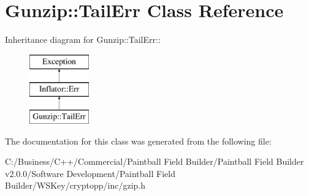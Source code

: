 \hypertarget{class_gunzip_1_1_tail_err}{
\section{Gunzip::TailErr Class Reference}
\label{class_gunzip_1_1_tail_err}
}
Inheritance diagram for Gunzip::TailErr::\begin{figure}[H]
\begin{center}
\leavevmode
\includegraphics[height=3cm]{class_gunzip_1_1_tail_err}
\end{center}
\end{figure}


The documentation for this class was generated from the following file:\begin{DoxyCompactItemize}
\item 
C:/Business/C++/Commercial/Paintball Field Builder/Paintball Field Builder v2.0.0/Software Development/Paintball Field Builder/WSKey/cryptopp/inc/gzip.h\end{DoxyCompactItemize}
